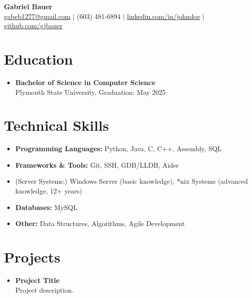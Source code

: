 \documentclass[11pt]{article}
\begin{document}
\begin{center}
    {\LARGE \textbf{Gabriel Bauer}} \\
    \vspace{0.1in}
    \href{mailto:gabeb1277@gmail.com}{gabeb1277@gmail.com} $\vert$ 
    (603) 481-6894 $\vert$ 
    \href{https://linkedin.com/in/johndoe}{linkedin.com/in/johndoe} $\vert$
    \href{https://github.com/gjbauer}{github.com/gjbauer}
\end{center}

\section*{Education}
\vspace{-0.1in}
\begin{itemize}[leftmargin=*]
    \item \textbf{Bachelor of Science in Computer Science} \\
    Plymouth State University, Graduation: May 2025 \\
\end{itemize}

\section*{Technical Skills}
\vspace{-0.1in}
\begin{itemize}[leftmargin=*]
    \item \textbf{Programming Languages:} Python, Java, C, C++, Assembly, SQL
    \item \textbf{Frameworks \& Tools:} Git, SSH, GDB/LLDB, Aider
    \item \textof(Server Systems:) Windows Server (basic knowledge), *nix Systems (advanced knowledge, 12+ years)
    \item \textbf{Databases:} MySQL
    \item \textbf{Other:} Data Structures, Algorithms, Agile Development
\end{itemize}

\section*{Projects}
\vspace{-0.1in}
\begin{itemize}[leftmargin=*]
    \item \textbf{Project Title} \\
    Project description.
\end{itemize}
\end{document}
